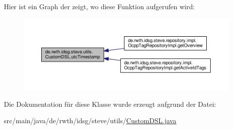Hier ist ein Graph der zeigt, wo diese Funktion aufgerufen wird\-:\nopagebreak
\begin{figure}[H]
\begin{center}
\leavevmode
\includegraphics[width=350pt]{classde_1_1rwth_1_1idsg_1_1steve_1_1utils_1_1_custom_d_s_l_a588f1723f1c9760604fb917d73e101b1_icgraph}
\end{center}
\end{figure}




Die Dokumentation für diese Klasse wurde erzeugt aufgrund der Datei\-:\begin{DoxyCompactItemize}
\item 
src/main/java/de/rwth/idsg/steve/utils/\hyperlink{_custom_d_s_l_8java}{Custom\-D\-S\-L.\-java}\end{DoxyCompactItemize}
